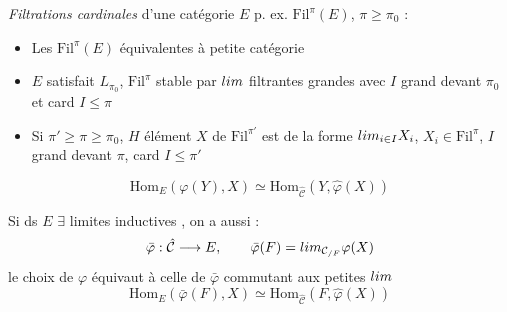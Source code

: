 \documentclass[11pt,a4paper]{article}
\begin{document}
\emph{Filtrations cardinales} d'une catégorie $E$ \struck{\ill{}} p. ex.
$\mathrm{Fil}^{\pi}(E)$, $\pi \geqslant \pi_{0}$ :
\begin{itemize}
  \item[a)] Les $\mathrm{Fil}^{\pi}(E)$ équivalentes à petite catégorie
  \item[b)]  $E$ satisfait $L_{\pi_{0}}$, $\mathrm{Fil}^{\pi}$
    stable par $\varinjlim$ filtrantes grandes avec $I$ grand devant
    $\pi_{0}$ et card $I \leqslant \pi$
  \item[c)] Si $\pi' \geqslant \pi \geqslant \pi_{0}$, $H$ élément $X$ de
    $\mathrm{Fil}^{\pi'}$ est de la forme $\varinjlim_{i \in I} X_{i}$, $X_{i}
    \in \mathrm{Fil}^{\pi}$, $I$ grand devant $\pi$, card $I \leqslant \pi'$
\end{itemize}


\[
  \mathrm{Hom}_{E}(\varphi(Y), X) \simeq \mathrm{Hom}_{\hat{\mathcal{C}}}
  (Y, \hat{\varphi}(X))
\]
\struck{\ill{}} 

Si ds $E$ $\exists$ limites inductives , on a aussi :
\[
  \bar{\varphi} : \hat{\mathcal{C}} \longrightarrow E, \qquad
  \bar{\varphi}(F) = \varinjlim_{\mathcal{C}_{/F}} \varphi(X)
\]
le choix de $\varphi$ équivaut à celle de $\bar{\varphi}$ commutant aux
petites $\varinjlim$
\[
  \mathrm{Hom}_{E}(\bar{\varphi}(F), X) \simeq
  \mathrm{Hom}_{\hat{\mathcal{C}}}(F, \hat{\varphi}(X))
\]
\end{document}
